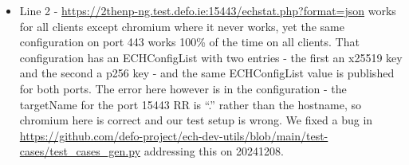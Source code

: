 \begin{itemize}
\item Line 2 - \url{https://2thenp-ng.test.defo.ie:15443/echstat.php?format=json} works for all
    clients except chromium where it never works, yet the same configuration on port 443 works
    100\% of the time on all clients. That configuration has an ECHConfigList with two
    entries - the first an x25519 key and the second a p256 key - and the same ECHConfigList 
    value is published for both ports. The error here however is in the configuration - the
    targetName for the port 15443 RR is ``.'' rather than the hostname, so chromium here
    is correct and our test setup is wrong. We fixed a bug in 
    \url{https://github.com/defo-project/ech-dev-utils/blob/main/test-cases/test_cases_gen.py}
        addressing this on 20241208. 
\end{itemize}
